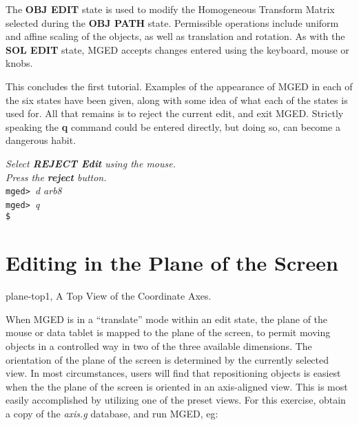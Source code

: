The {\bf OBJ EDIT} state is used to modify the
Homogeneous Transform Matrix selected during the {\bf OBJ PATH} state.
Permissible operations include uniform and affine scaling of the objects, 
as well as translation and rotation.
As with the {\bf SOL EDIT} state, MGED accepts changes entered using
the keyboard, mouse or knobs.

This concludes the first tutorial.  Examples of the appearance of MGED
in each of the six states have been given, along with some idea of what
each of the states is used for.  All that remains is to reject the current
edit, and exit MGED.  Strictly speaking the {\bf q} command could be entered
directly, but doing so, can become a dangerous habit.

\noindent
{\em Select {\bf REJECT Edit} using the mouse.}\\
{\em Press the {\bf reject} button.}\\
{\tt mged> }{\em d arb8}\\
{\tt mged> }{\em q}\\
{\tt \$ }\\

\section{Editing in the Plane of the Screen}
\mfig plane-top1, A Top View of the Coordinate Axes.

When MGED is in a ``translate'' mode within an edit state,
the plane of the mouse or data tablet is mapped to
the plane of the screen, to permit moving objects in a
controlled way in two of the three available dimensions.
The orientation of the plane of the screen is determined by the
currently selected view.
In most circumstances, users will find that repositioning objects
is easiest when the the plane of the screen is oriented in an
axis-aligned view.  This is most easily accomplished by utilizing
one of the preset views.
For this exercise, obtain a copy of the {\em axis.g} database,
and run MGED, eg:



